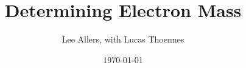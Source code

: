 \documentclass[%
 reprint,
 amsmath,amssymb,
 aps,
]{revtex4-1}
\begin{document}
\newcommand {\gr}{$\gamma-ray$\xspace}
\newcommand {\grs}{$\gamma-rays$\xspace}
\newcommand {\gp}{$\gamma_{\text{photon}}$\xspace}
\newcommand {\cs}{$^{137}$Cesium \xspace}
\newcommand {\ba}{$^{133}$Barium \xspace}
\newcommand {\co}{$^{60}$Cobalt \xspace}
\newcommand {\na}{$^{22}$Sodium \xspace}
\title{Determining Electron Mass}%


\author{Lee Allers, with Lucas Thoennes}




\date{\today}%
\end{document}
